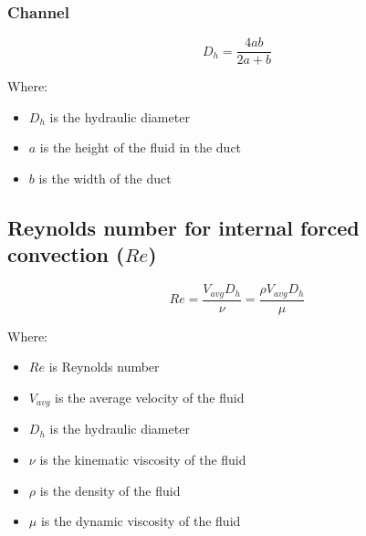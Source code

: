 \documentclass[11pt]{article}
\begin{document}
\subsubsection{Channel}
\label{sec:orgee807a1}
\[D_h = \frac{4ab}{2a + b}\]

Where:
\begin{itemize}
\item \(D_h\) is the hydraulic diameter
\item \(a\) is the height of the fluid in the duct
\item \(b\) is the width of the duct
\end{itemize}

 \newpage
\subsection{Reynolds number for internal forced convection (\(Re\))}
\label{sec:orgc1f6ce7}
\[Re = \frac{V_{avg} D_h}{\nu} = \frac{\rho V_{avg} D_h}{\mu}\]

Where:
\begin{itemize}
\item \(Re\) is Reynolds number
\item \(V_{avg}\) is the average velocity of the fluid
\item \(D_h\) is the hydraulic diameter
\item \(\nu\) is the kinematic viscosity of the fluid
\item \(\rho\) is the density of the fluid
\item \(\mu\) is the dynamic viscosity of the fluid
\end{itemize}
\end{document}
